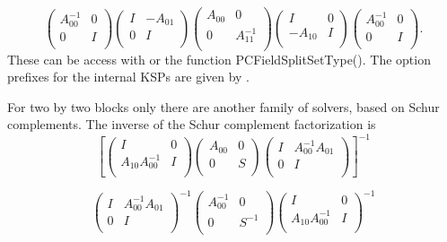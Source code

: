 \[
\left( \begin{array}{cc}
A_{00}^{-1}   & 0 \\
0 & I \\
\end{array} \right)
\left( \begin{array}{cc}
I   & -A_{01} \\
0 & I \\
\end{array} \right)
\left( \begin{array}{cc}
A_{00}   & 0 \\
0 & A_{11}^{-1} \\
\end{array} \right)
\left( \begin{array}{cc}
I   & 0 \\
-A_{10} & I \\
\end{array} \right)
\left( \begin{array}{cc}
A_{00}^{-1}   & 0 \\
0 & I \\
\end{array} \right).
\]
These can be access with   or the function PCFieldSplitSetType(). The option prefixes for the internal KSPs are given by .

For two by two blocks only there are another family of solvers, based on Schur complements. The inverse of the Schur complement factorization is
\[
\left[
\left( \begin{array}{cc}
I   & 0 \\
A_{10}A_{00}^{-1} & I \\
\end{array} \right)
\left( \begin{array}{cc}
A_{00}  & 0 \\
0 & S \\
\end{array} \right)
\left( \begin{array}{cc}
I   & A_{00}^{-1} A_{01} \\
0 & I \\
\end{array} \right)
\right]^{-1}
\]


\[
\left( \begin{array}{cc}
I   & A_{00}^{-1} A_{01} \\
0 & I \\
\end{array} \right)^{-1}
\left( \begin{array}{cc}
A_{00}^{-1}  & 0 \\
0 & S^{-1} \\
\end{array} \right)
\left( \begin{array}{cc}
I   & 0 \\
A_{10}A_{00}^{-1} & I \\
\end{array} \right)^{-1}
\]


